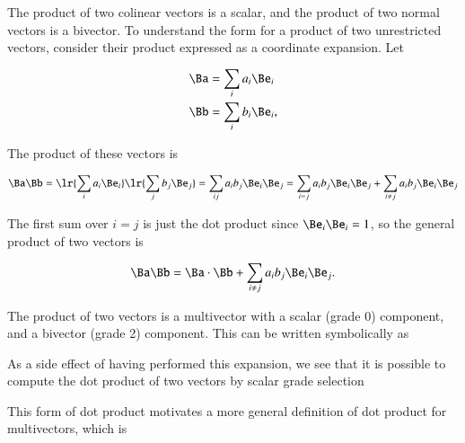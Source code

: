 The product of two colinear vectors is a scalar, and the product of two normal vectors is a bivector.
To understand the form for a product of two unrestricted vectors, consider their product expressed as a coordinate expansion.  Let

\begin{dmath}\label{eqn:SimpleProducts2:1160}
\begin{aligned}
\Ba &= \sum_i a_i \Be_i \\
\Bb &= \sum_i b_i \Be_i,
\end{aligned}
\end{dmath}

The product of these vectors is

\begin{dmath}\label{eqn:SimpleProducts2:1360}
\Ba \Bb
=
\lr{ \sum_i a_i \Be_i } \lr{ \sum_j b_j \Be_j }
=
\sum_{ij} a_i b_j \Be_i \Be_j
=
\sum_{i = j} a_i b_j \Be_i \Be_j
+
\sum_{i \ne j} a_i b_j \Be_i \Be_j
\end{dmath}

The first sum over \( i = j \) is just the dot product since \( \Be_i \Be_i = 1 \), so the general product of two vectors is

\begin{dmath}\label{eqn:SimpleProducts2:1480}
\Ba \Bb
=
\Ba \cdot \Bb
+
\sum_{i \ne j} a_i b_j \Be_i \Be_j.
\end{dmath}

The product of two vectors is a multivector with a scalar (grade 0) component, and a bivector (grade 2) component.  This can be written symbolically as


As a side effect of having performed this expansion, we see that it is possible to compute the dot product of two vectors by scalar grade selection


This form of dot product motivates a more general definition of dot product for multivectors, which is


